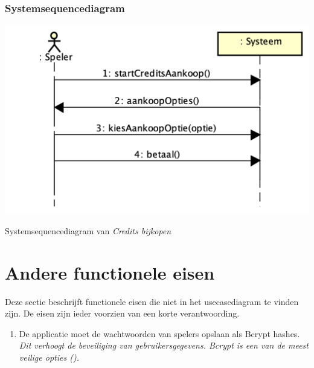 \subsubsection{Systemsequencediagram}
\begin{mpfigure}
   \centering
   \includegraphics[width=\linewidth]{../Afbeeldingen/Credits bijkopen sequence diagram.png}
   \caption{Systemsequencediagram van \textit{Credits bijkopen}} \label{fig:ssdcreditsbijkopen}
\end{mpfigure}



\clearpage\section{Andere functionele eisen}
Deze sectie beschrijft functionele eisen die niet in het usecasediagram te vinden zijn. De eisen zijn ieder voorzien van een korte verantwoording.
\begin{enumerate}[label=\textbf{FE\arabic*}.]
   \item De applicatie moet de wachtwoorden van spelers opslaan als Bcrypt hashes.
         \\ \textit{Dit verhoogt de beveiliging van gebruikersgegevens. Bcrypt is een van de meest veilige opties (\cite{bcrypt}).}
\end{enumerate}

